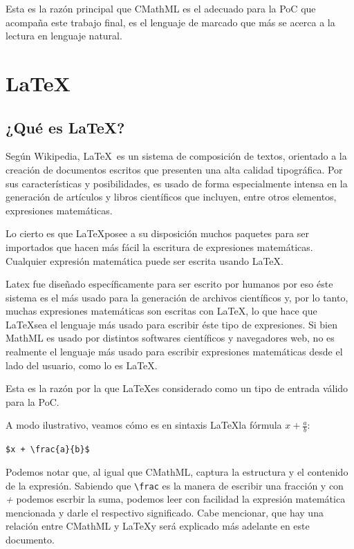 Esta es la razón principal que CMathML es el adecuado para la PoC que acompaña este trabajo final, es el lenguaje de marcado 
que más se acerca a la lectura en lenguaje natural.

\section{\LaTeX}

\subsection{¿Qué es \LaTeX ?}

Según Wikipedia, \LaTeX\ es un sistema de composición de textos, orientado a la creación de documentos escritos que 
presenten una alta calidad tipográfica. Por sus características y posibilidades, es usado de forma especialmente intensa en la 
generación de artículos y libros científicos que incluyen, entre otros elementos, expresiones matemáticas.

Lo cierto es que \LaTeX posee a su disposición muchos paquetes para ser importados que hacen más fácil la escritura de
expresiones matemáticas. Cualquier expresión matemática puede ser escrita usando \LaTeX.

Latex fue diseñado específicamente para ser escrito por humanos por eso éste sistema es el más usado para la generación de archivos científicos y, por lo tanto, muchas expresiones matemáticas
son escritas con \LaTeX, lo que hace que \LaTeX sea el lenguaje más usado para escribir éste tipo de expresiones.
Si bien MathML es usado por distintos softwares científicos y navegadores web, no es realmente el lenguaje más usado para escribir expresiones matemáticas desde 
el lado del usuario, como lo es \LaTeX.

Esta es la razón por la que \LaTeX es considerado como un tipo de entrada válido para la PoC.

A modo ilustrativo, veamos cómo es en sintaxis \LaTeX la fórmula $x + \frac{a}{b}$:

\verb|$x + \frac{a}{b}$|

Podemos notar que, al igual que CMathML, captura la estructura y el contenido de la expresión. Sabiendo que \verb|\frac| es la manera de escribir una fracción y con \textit{+} podemos escrbir la suma, podemos leer con facilidad la expresión matemática mencionada y darle el respectivo significado. Cabe mencionar, que hay una relación entre CMathML y \LaTeX y será explicado más adelante en este documento.

